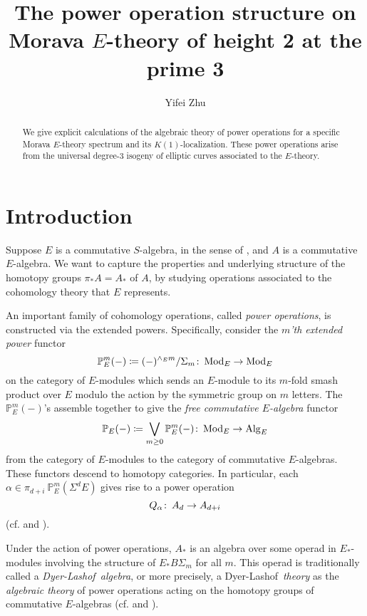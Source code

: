 \documentclass{gtpart}
\title{The power operation structure on Morava $E$-theory of height 2 at the prime 3}
\author{Yifei Zhu}
\theoremstyle{definition}
\theoremstyle{remark}
\def\co{\colon\thinspace}
\newcommand{\mb}[1]{\mathbb{#1}}
\newcommand{\Mod}{{\rm Mod}}
\newcommand{\Alg}{{\rm Alg}}
\newcommand{\cf}{cf.\thinspace}
\newcommand{\DL}{Dyer-Lashof~}
\newcommand{\BP}{{\mb P}}
\newcommand{\A}{\alpha}
\begin{document}
\begin{abstract}
 We give explicit calculations of the algebraic theory of power operations for a specific Morava $E$-theory spectrum and its $K(1)$-localization.  
 These power operations arise from the universal degree-3 isogeny of elliptic curves associated to the $E$-theory.  
\end{abstract}


\maketitle
\section{Introduction}

Suppose $E$ is a commutative $S$-algebra, in the sense of \cite{EKMM}, and $A$ is a commutative $E$-algebra.  
We want to capture the properties and underlying structure of the homotopy groups $\pi_* A = A_*$ of $A$, 
by studying operations associated to the cohomology theory that $E$ represents.  

An important family of cohomology operations, called {\em power operations}, is constructed via the extended powers.  
Specifically, consider the {\em $m$'th extended power} functor 
\[
 \BP_E^m (-) \coloneqq (-)^{\wedge_E m} / \Sigma_m \co \Mod_E \to \Mod_E 
\]
on the category of $E$-modules which sends an $E$-module to its $m$-fold smash product over $E$ modulo the action by the symmetric group on $m$ letters.  
The $\BP_E^m (-)$'s assemble together to give the {\em free commutative $E$-algebra} functor 
\[
 \BP_E (-) \coloneqq \bigvee_{m \geq 0} \BP_E^m (-) \co \Mod_E \to \Alg_E 
\]
from the category of $E$-modules to the category of commutative $E$-algebras.  
These functors descend to homotopy categories.  
In particular, each $\A \in \pi_{d+i}~\BP_E^m (\Sigma^d E)$ gives rise to a power operation 
\[
 Q_\A \co A_d \to A_{d+i} 
\]
(\cf \cite[Sections I.2 and IX.1]{H_infty} and \cite[Section 3]{cong}).  

Under the action of power operations, $A_*$ is an algebra over some operad in $E_*$-modules involving the structure of $E_* B\Sigma_m$ for all $m$.  
This operad is traditionally called a {\em \DL algebra}, or more precisely, 
a \DL {\em theory} as the {\em algebraic theory} of power operations acting on the homotopy groups of commutative $E$-algebras 
(\cf \cite[Chapters III, VIII, and IX]{H_infty} and \cite[Section 9]{lpo}).  
\end{document}
